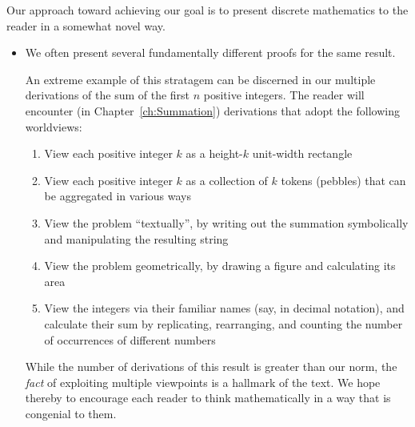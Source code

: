Our approach toward achieving our goal is to present discrete
mathematics to the reader in a somewhat novel way.
\begin{itemize}
\item
We often present several fundamentally different proofs for the same
result.

An extreme example of this stratagem can be discerned in our multiple
derivations of the sum of the first $n$ positive integers.  The reader
will encounter (in Chapter~\ref{ch:Summation}) derivations that adopt
the following worldviews:
  \begin{enumerate}
  \item
View each positive integer $k$ as a height-$k$ unit-width rectangle
  \item
View each positive integer $k$ as a collection of $k$ tokens (pebbles)
that can be aggregated in various ways
  \item
View the problem ``textually'', by writing out the summation
symbolically and manipulating the resulting string
  \item
View the problem geometrically, by drawing a figure and calculating
its area
  \item
View the integers via their familiar names (say, in decimal notation),
and calculate their sum by replicating, rearranging, and counting the
number of occurrences of different numbers
  \end{enumerate}
While the number of derivations of this result is greater than our
norm, the {\em fact} of exploiting multiple viewpoints is a hallmark
of the text.  We hope thereby to encourage each reader to think
mathematically in a way that is congenial to them.


\end{itemize}
